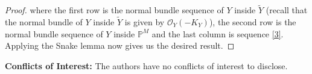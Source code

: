 \documentclass[11pt,twoside]{amsart}
\theoremstyle{plain}
\numberwithin{equation}{section}
\theoremstyle{definition}
\begin{document}
\begin{proof}
where the first row is the normal bundle sequence of $Y$ inside $\widetilde{Y}$ (recall that the normal bundle of $Y$ inside $\widetilde{Y}$ is given by $\mathcal{O}_Y(-K_Y)$), the second row is the normal bundle sequence of $Y$ inside $\mathbb{P}^M$ and the last column is sequence \ref{3}. Applying the Snake lemma now gives us the desired result. 



\end{proof}


\vspace{0.2cm}


\noindent\textbf{Conflicts of Interest:} The authors have no conflicts of interest to disclose.






\end{document}
